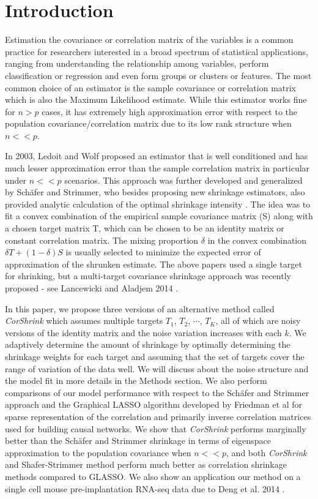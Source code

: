 
\section{Introduction}
Estimation the covariance or correlation matrix of the variables is a common practice for researchers interested in a broad spectrum of statistical applications, ranging from understanding the relationship among variables, perform classification or regression and even form groups or clusters or features. The most common choice of an estimator is the sample covariance or correlation matrix which is also the Maximum Likelihood estimate. While this estimator works fine for $ n > p$ cases, it has extremely high approximation error with respect to the population covariance/correlation matrix due to its low rank structure when $ n << p$. 

In 2003, Ledoit and Wolf proposed an estimator that is well conditioned and has much lesser approximation error than the sample correlation matrix \cite{Ledoit2003} \cite{Ledoit2004} in particular under $n <<p$ scenarios. This approach was further developed and generalized by Sch\"{a}fer and Strimmer, who besides proposing new shrinkage estimators, also provided  analytic calculation of the optimal shrinkage intensity \cite{Shafer2005}. The idea was to fit a convex combination of the empirical sample covariance matrix (S) along with a chosen target matrix T, which can be chosen to be an  identity matrix or constant correlation matrix. The mixing proportion $\delta$ in the convex combination $\delta T + (1- \delta) S$ is usually selected to minimize the expected error of approximation of the shrunken estimate. The above papers used a single target for shrinking, but a multi-target covariance shrinkage approach was recently proposed - see Lancewicki and Aladjem  2014 \cite{Lancewiki2014}. 

In this paper, we propose three versions of an alternative method called \textit{CorShrink} which assumes multiple targets 
$T_1$, $T_2$, $\cdots$, $T_K$, all of which are noisy versions of the identity matrix and the noise variation increases with each $k$. We adaptively determine the amount of shrinkage by optimally determining the shrinkage weights for each target and assuming that the set of targets cover the range of variation of the data well. We will discuss about the noise structure and the model fit in more details in the Methods section.  We also perform comparisons of our model performance with respect to the Sch\"{a}fer and Strimmer approach and the Graphical LASSO algorithm developed by Friedman et al \cite{Friedman2008} for sparse representation of the correlation and primarily inverse correlation matrices used for building causal networks. We show that  \textit{CorShrink} performs marginally better than the Sch\"{a}fer and Strimmer shrinkage in terms of eigenspace approximation to the population covariance when $ n << p$, and both \textit{CorShrink} and Shafer-Strimmer method perform much better as correlation shrinkage methods compared to GLASSO. We also show an application our method on a single cell mouse pre-implantation RNA-seq data due to Deng et al. 2014 \cite{Deng2014}.


